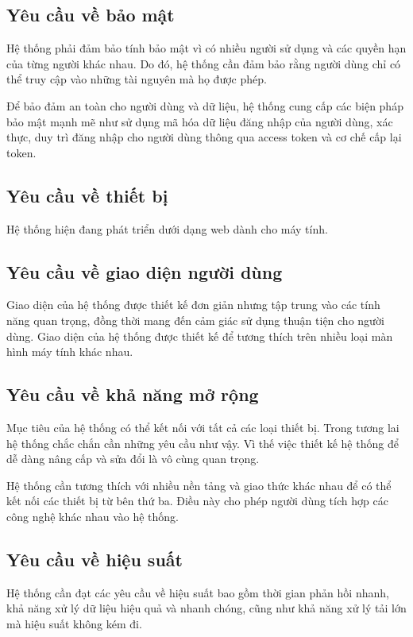 \documentclass[../DoAn.tex]{subfiles}
\begin{document}
\subsection{Yêu cầu về bảo mật}
\label{subsection:2.4.1}
Hệ thống phải đảm bảo tính bảo mật vì có nhiều người sử dụng và các quyền hạn của từng người khác nhau. Do đó, hệ thống cần đảm bảo rằng người dùng chỉ có thể truy cập vào những tài nguyên mà họ được phép. 

Để bảo đảm an toàn cho người dùng và dữ liệu, hệ thống cung cấp các biện pháp bảo mật mạnh mẽ như sử dụng mã hóa dữ liệu đăng nhập của người dùng, xác thực, duy trì đăng nhập cho người dùng thông qua access token và cơ chế cấp lại token.
\subsection{Yêu cầu về thiết bị}
\label{subsection:2.4.2}
Hệ thống hiện đang phát triển dưới dạng web dành cho máy tính.

\subsection{Yêu cầu về giao diện người dùng}
\label{subsection:2.4.3}

Giao diện của hệ thống được thiết kế đơn giản nhưng tập trung vào các tính năng quan trọng, đồng thời mang đến cảm giác sử dụng thuận tiện cho người dùng. Giao diện của hệ thống được thiết kế để tương thích trên nhiều loại màn hình máy tính khác nhau.

\subsection{Yêu cầu về khả năng mở rộng}
\label{subsection:2.4.4}

Mục tiêu của hệ thống có thể kết nối với tất cả các loại thiết bị. Trong tương lai hệ thống chắc chắn cần những yêu cầu như vậy. Vì thế việc thiết kế hệ thống để dễ dàng nâng cấp và sửa đổi là vô cùng quan trọng. 

Hệ thống cần tương thích với nhiều nền tảng và giao thức khác nhau để có thể kết nối các thiết bị từ bên thứ ba. Điều này cho phép người dùng tích hợp các công nghệ khác nhau vào hệ thống.

\subsection{Yêu cầu về hiệu suất}
\label{subsection:2.4.4}

Hệ thống cần đạt các yêu cầu về hiệu suất bao gồm thời gian phản hồi nhanh, khả năng xử lý dữ liệu hiệu quả và nhanh chóng, cũng như khả năng xử lý tải lớn mà hiệu suất không kém đi.
\end{document}
